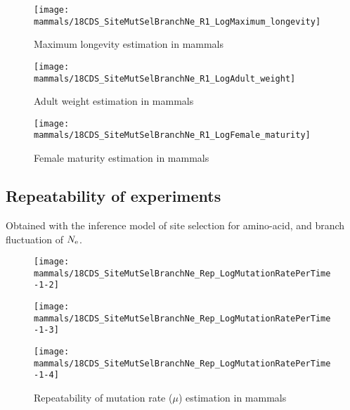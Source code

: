 \begin{figure}[H]
    \centering
    \texttt{[image: mammals/18CDS\_SiteMutSelBranchNe\_R1\_LogMaximum\_longevity]}
    \caption[Maximum longevity estimation in mammals]{Maximum longevity estimation in mammals}
\end{figure}

\begin{figure}[H]
    \centering
    \texttt{[image: mammals/18CDS\_SiteMutSelBranchNe\_R1\_LogAdult\_weight]}
    \caption[Adult weight estimation in mammals]{Adult weight estimation in mammals}
\end{figure}

\begin{figure}[H]
    \centering
    \texttt{[image: mammals/18CDS\_SiteMutSelBranchNe\_R1\_LogFemale\_maturity]}
    \caption[Female maturity estimation in mammals]{Female maturity estimation in mammals}
\end{figure}

\subsection{Repeatability of experiments}
Obtained with the inference model of site selection for amino-acid, and branch fluctuation of $N_{\mathrm{e}}$.

\begin{figure}[H]
    \centering
    \begin{minipage}{0.32\linewidth}
        \texttt{[image: mammals/18CDS\_SiteMutSelBranchNe\_Rep\_LogMutationRatePerTime-1-2]}
    \end{minipage} \hfill
    \begin{minipage}{0.32\linewidth}
        \texttt{[image: mammals/18CDS\_SiteMutSelBranchNe\_Rep\_LogMutationRatePerTime-1-3]}
    \end{minipage} \hfill
    \begin{minipage}{0.32\linewidth}
        \texttt{[image: mammals/18CDS\_SiteMutSelBranchNe\_Rep\_LogMutationRatePerTime-1-4]}
    \end{minipage}
    \caption[Repeatability of mutation rate estimation in mammals]{Repeatability of mutation rate ($\mu$) estimation in mammals}
\end{figure}

